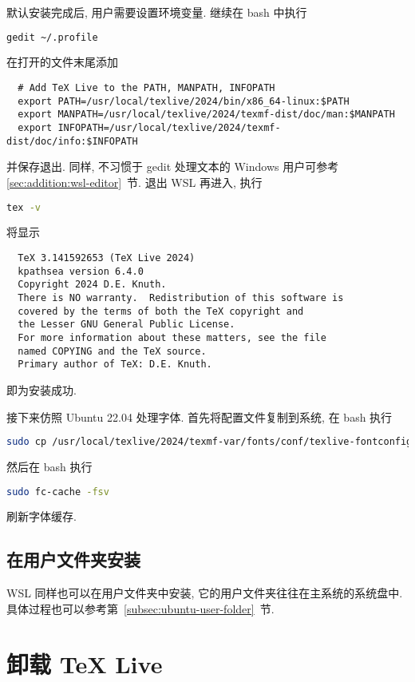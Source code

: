 默认安装完成后, 用户需要设置环境变量.
继续在 \textsf{bash} 中执行
\begin{lstlisting}[language = bash]
  gedit ~/.profile
\end{lstlisting}
在打开的文件末尾添加
\begin{lstlisting}
  # Add TeX Live to the PATH, MANPATH, INFOPATH
  export PATH=/usr/local/texlive/2024/bin/x86_64-linux:$PATH
  export MANPATH=/usr/local/texlive/2024/texmf-dist/doc/man:$MANPATH
  export INFOPATH=/usr/local/texlive/2024/texmf-dist/doc/info:$INFOPATH
\end{lstlisting}
并保存退出.
同样,
不习惯于 \textsf{gedit} 处理文本的 Windows 用户可参考 \ref{sec:addition:wsl-editor}~节.
退出 WSL 再进入,
执行
\begin{lstlisting}[language=bash]
  tex -v
\end{lstlisting}
将显示
\begin{lstlisting}
  TeX 3.141592653 (TeX Live 2024)
  kpathsea version 6.4.0
  Copyright 2024 D.E. Knuth.
  There is NO warranty.  Redistribution of this software is
  covered by the terms of both the TeX copyright and
  the Lesser GNU General Public License.
  For more information about these matters, see the file
  named COPYING and the TeX source.
  Primary author of TeX: D.E. Knuth.
\end{lstlisting}
即为安装成功.

接下来仿照 Ubuntu 22.04 处理字体.
首先将配置文件复制到系统,
在 \textsf{bash} 执行
\begin{lstlisting}[language=bash]
  sudo cp /usr/local/texlive/2024/texmf-var/fonts/conf/texlive-fontconfig.conf /etc/fonts/conf.d/09-texlive.conf
\end{lstlisting}
然后在 \textsf{bash} 执行
\begin{lstlisting}[language=bash]
  sudo fc-cache -fsv
\end{lstlisting}
刷新字体缓存.

\subsection{在用户文件夹安装}

WSL 同样也可以在用户文件夹中安装,
它的用户文件夹往往在主系统的系统盘中.
具体过程也可以参考第~\ref{subsec:ubuntu-user-folder}~节.

\section{卸载 \TeX{} Live}

